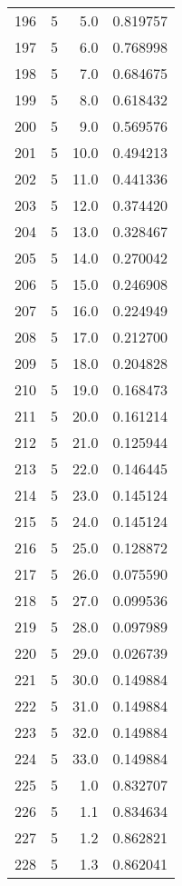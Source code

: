 \begin{tabular}{lrrr}
196 &        5 &      5.0 &  0.819757 \\
197 &        5 &      6.0 &  0.768998 \\
198 &        5 &      7.0 &  0.684675 \\
199 &        5 &      8.0 &  0.618432 \\
200 &        5 &      9.0 &  0.569576 \\
201 &        5 &     10.0 &  0.494213 \\
202 &        5 &     11.0 &  0.441336 \\
203 &        5 &     12.0 &  0.374420 \\
204 &        5 &     13.0 &  0.328467 \\
205 &        5 &     14.0 &  0.270042 \\
206 &        5 &     15.0 &  0.246908 \\
207 &        5 &     16.0 &  0.224949 \\
208 &        5 &     17.0 &  0.212700 \\
209 &        5 &     18.0 &  0.204828 \\
210 &        5 &     19.0 &  0.168473 \\
211 &        5 &     20.0 &  0.161214 \\
212 &        5 &     21.0 &  0.125944 \\
213 &        5 &     22.0 &  0.146445 \\
214 &        5 &     23.0 &  0.145124 \\
215 &        5 &     24.0 &  0.145124 \\
216 &        5 &     25.0 &  0.128872 \\
217 &        5 &     26.0 &  0.075590 \\
218 &        5 &     27.0 &  0.099536 \\
219 &        5 &     28.0 &  0.097989 \\
220 &        5 &     29.0 &  0.026739 \\
221 &        5 &     30.0 &  0.149884 \\
222 &        5 &     31.0 &  0.149884 \\
223 &        5 &     32.0 &  0.149884 \\
224 &        5 &     33.0 &  0.149884 \\
225 &        5 &      1.0 &  0.832707 \\
226 &        5 &      1.1 &  0.834634 \\
227 &        5 &      1.2 &  0.862821 \\
228 &        5 &      1.3 &  0.862041 \\

\end{tabular}
